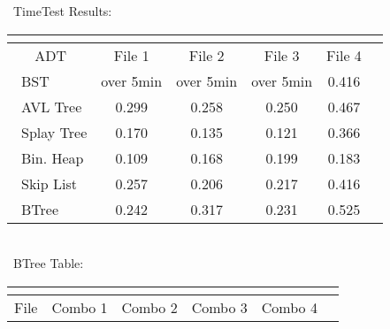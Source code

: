 \documentclass[8]{report}
\begin{document}
\begin{table}[ht]



\begin{threeparttable}
\ TimeTest Results: \\
\begin{tabular}{l*{5}{c}}
   &\multicolumn{1}{c}{}  &\multicolumn{1}{c}{}   &\multicolumn{1}{c}{} &\multicolumn{1}{c}{}  &\multicolumn{1}{c}{}   \\
\hline\hline


     \multicolumn{1}{c}{ADT}  &\multicolumn{1}{c}{File 1}   &\multicolumn{1}{c}{File  2} &\multicolumn{1}{c}{File 3}  &\multicolumn{1}{c}{File 4}   \\


\hline


\    BST   &     over 5min  &    over 5min  &   over  5min  &  0.416   \\
                       

\       AVL  Tree&      0.299  &   0.258  &   0.250  &   0.467              \\
                  
\       Splay Tree&     0.170   &  0.135  &  0.121  &  0.366         \\
     
 \       Bin. Heap    &   0.109  &    0.168  &   0.199 & 0.183             \\
 
 \    Skip List    &     0.257  &    0.206 &   0.217   &  0.416   \\
 
 \    BTree     &     0.242  &    0.317  &   0.231   &  0.525   \\
 
\hline 

\end{tabular}
\      \\

\ BTree Table:\\
\begin{tabular}{l*{5}{c}}
   &\multicolumn{1}{c}{}  &\multicolumn{1}{c}{}   &\multicolumn{1}{c}{} &\multicolumn{1}{c}{}  &\multicolumn{1}{c}{}   \\
\hline\hline


     \multicolumn{1}{c}{File }  &\multicolumn{1}{c}{Combo 1}   &\multicolumn{1}{c}{Combo  2} &\multicolumn{1}{c}{Combo 3}  &\multicolumn{1}{c}{Combo 4}   \\


\hline



\end{tabular}
\end{threeparttable}
\end{table}
\end{document}
